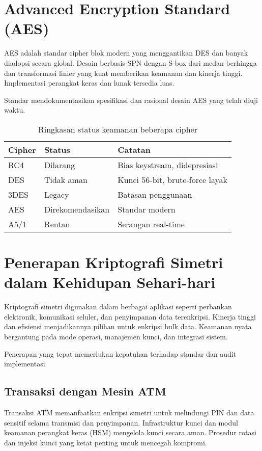 \documentclass[../main.tex]{subfiles}
\begin{document}
\section{Advanced Encryption Standard (AES)}
AES adalah standar cipher blok modern yang menggantikan DES dan banyak diadopsi secara global. Desain berbasis SPN dengan S-box dari medan berhingga dan transformasi linier yang kuat memberikan keamanan dan kinerja tinggi. Implementasi perangkat keras dan lunak tersedia luas.

Standar \textcite{fips197} mendokumentasikan spesifikasi dan rasional desain AES yang telah diuji waktu.

\begin{table}[h]
\centering
\caption{Ringkasan status keamanan beberapa cipher}
\label{tab:review-cipher}
\begin{tabular}{lll}
\toprule
Cipher & Status & Catatan \\
\midrule
RC4 & Dilarang & Bias keystream, didepresiasi \parencite{rfc7465} \\
DES & Tidak aman & Kunci 56-bit, brute-force layak \\
3DES & Legacy & Batasan penggunaan \parencite{nist800131a} \\
AES & Direkomendasikan & Standar modern \parencite{fips197} \\
A5/1 & Rentan & Serangan real-time \parencite{biryukov2000a5} \\
\bottomrule
\end{tabular}
\end{table}

\section{Penerapan Kriptografi Simetri dalam Kehidupan Sehari-hari}
Kriptografi simetri digunakan dalam berbagai aplikasi seperti perbankan elektronik, komunikasi seluler, dan penyimpanan data terenkripsi. Kinerja tinggi dan efisiensi menjadikannya pilihan untuk enkripsi bulk data. Keamanan nyata bergantung pada mode operasi, manajemen kunci, dan integrasi sistem.

Penerapan yang tepat memerlukan kepatuhan terhadap standar dan audit implementasi.

\subsection{Transaksi dengan Mesin ATM}
Transaksi ATM memanfaatkan enkripsi simetri untuk melindungi PIN dan data sensitif selama transmisi dan penyimpanan. Infrastruktur kunci dan modul keamanan perangkat keras (HSM) mengelola kunci secara aman. Prosedur rotasi dan injeksi kunci yang ketat penting untuk mencegah kompromi.
\end{document}
